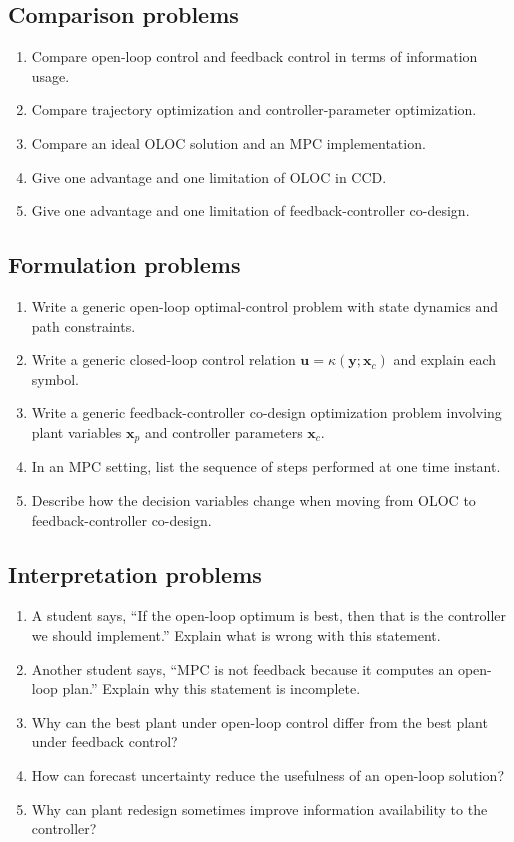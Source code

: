 \documentclass[11pt]{article}
\newcommand{\vect}[1]{\boldsymbol{#1}}
\newcommand{\xp}{\vect{x}_p}
\newcommand{\xc}{\vect{x}_c}
\newcommand{\uvec}{\vect{u}}
\newcommand{\yvec}{\vect{y}}
\begin{document}
\subsection*{Comparison problems}
\begin{enumerate}[leftmargin=1.5em,label=\textbf{P\arabic*.},resume]
  \item Compare open-loop control and feedback control in terms of information usage.
  \item Compare trajectory optimization and controller-parameter optimization.
  \item Compare an ideal OLOC solution and an MPC implementation.
  \item Give one advantage and one limitation of OLOC in CCD.
  \item Give one advantage and one limitation of feedback-controller co-design.
\end{enumerate}

\subsection*{Formulation problems}
\begin{enumerate}[leftmargin=1.5em,label=\textbf{P\arabic*.},resume]
  \item Write a generic open-loop optimal-control problem with state dynamics and path constraints.
  \item Write a generic closed-loop control relation $\uvec=\kappa(\yvec;\xc)$ and explain each symbol.
  \item Write a generic feedback-controller co-design optimization problem involving plant variables $\xp$ and controller parameters $\xc$.
  \item In an MPC setting, list the sequence of steps performed at one time instant.
  \item Describe how the decision variables change when moving from OLOC to feedback-controller co-design.
\end{enumerate}

\subsection*{Interpretation problems}
\begin{enumerate}[leftmargin=1.5em,label=\textbf{P\arabic*.},resume]
  \item A student says, ``If the open-loop optimum is best, then that is the controller we should implement.'' Explain what is wrong with this statement.
  \item Another student says, ``MPC is not feedback because it computes an open-loop plan.'' Explain why this statement is incomplete.
  \item Why can the best plant under open-loop control differ from the best plant under feedback control?
  \item How can forecast uncertainty reduce the usefulness of an open-loop solution?
  \item Why can plant redesign sometimes improve information availability to the controller?
\end{enumerate}
\end{document}
